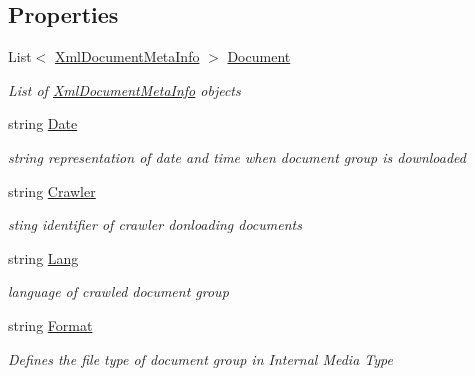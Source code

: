 \subsection*{Properties}
\begin{DoxyCompactItemize}
\item 
List$<$ \hyperlink{class_metainfo_e_u_cases_1_1_xml_document_meta_info}{Xml\-Document\-Meta\-Info} $>$ \hyperlink{class_metainfo_e_u_cases_1_1_xml_document_group_a1139a3ec22f91f2645b8fcd528b43c04}{Document}
\begin{DoxyCompactList}\small\item\em List of \hyperlink{class_metainfo_e_u_cases_1_1_xml_document_meta_info}{Xml\-Document\-Meta\-Info} objects \end{DoxyCompactList}\item 
string \hyperlink{class_metainfo_e_u_cases_1_1_xml_document_group_a66aa13c73ac4e0eda0d8d68e77e5a343}{Date}
\begin{DoxyCompactList}\small\item\em string representation of date and time when document group is downloaded \end{DoxyCompactList}\item 
string \hyperlink{class_metainfo_e_u_cases_1_1_xml_document_group_a0679781a8930fba75d53ba49eb7a78e1}{Crawler}
\begin{DoxyCompactList}\small\item\em sting identifier of crawler donloading documents \end{DoxyCompactList}\item 
string \hyperlink{class_metainfo_e_u_cases_1_1_xml_document_group_afdd8814f77d7ed75f13cd1f6a0998101}{Lang}
\begin{DoxyCompactList}\small\item\em language of crawled document group \end{DoxyCompactList}\item 
string \hyperlink{class_metainfo_e_u_cases_1_1_xml_document_group_a96eb3e67b5c92e28c00cab5d216872d4}{Format}
\begin{DoxyCompactList}\small\item\em Defines the file type of document group in Internal Media Type \end{DoxyCompactList}\item 

\end{DoxyCompactItemize}
